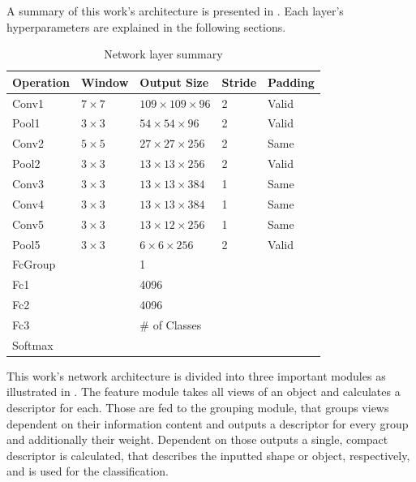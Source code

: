 A summary of this work's architecture is presented in .
Each layer's hyperparameters are explained in the following sections.
\begin{table}[]
\centering
\caption{Network layer summary}
\label{tab:network-layers}
	\begin{tabular}{lllll}
		Operation & Window       & Output Size                & Stride & Padding \\ \hline
		Conv1     & $7 \times 7$ & $109 \times 109 \times 96$ & 2      & Valid   \\
		Pool1     & $3 \times 3$ & $54 \times 54 \times 96$   & 2      & Valid   \\ \hline
		Conv2     & $5 \times 5$ & $27 \times 27 \times 256$  & 2      & Same    \\
		Pool2     & $3 \times 3$ & $13 \times 13 \times 256$  & 2      & Valid   \\ \hline
		Conv3     & $3 \times 3$ & $13 \times 13 \times 384$  & 1      & Same    \\ \hline
		Conv4     & $3 \times 3$ & $13 \times 13 \times 384$  & 1      & Same    \\ \hline
		Conv5     & $3 \times 3$ & $13 \times 12 \times 256$  & 1      & Same    \\
		Pool5     & $3 \times 3$ & $6 \times 6 \times 256$    & 2      & Valid   \\ \hline
		FcGroup   & 			 & 1					      &        &         \\ \hline
		Fc1       &              & 4096                       &        &         \\ \hline
		Fc2       &              & 4096                       &        &         \\ \hline
		Fc3       &              & \# of Classes              &        &         \\ \hline
		Softmax   &              &                            &        &         \\ \hline
	\end{tabular}
\end{table}
This work's network architecture is divided into three important modules as illustrated in .
The feature module takes all views of an object and calculates a descriptor for each.
Those are fed to the grouping module, that groups views dependent on their information content and outputs a descriptor for every group and additionally their weight.
Dependent on those outputs a single, compact descriptor is calculated, that describes the inputted shape or object, respectively, and is used for the classification.
